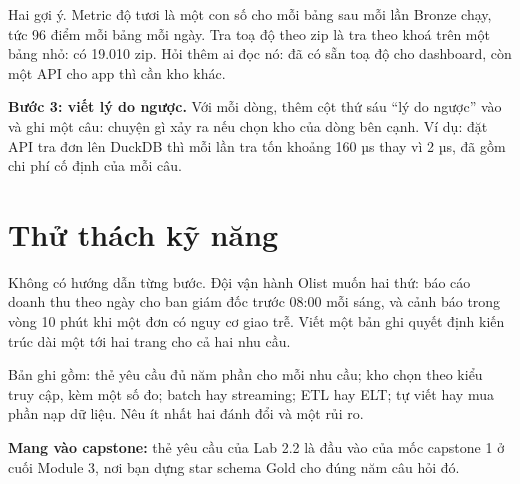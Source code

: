 Hai gợi ý. Metric độ tươi là một con số cho mỗi bảng sau mỗi lần Bronze chạy, tức 96 điểm mỗi bảng mỗi ngày. Tra toạ độ theo zip là tra theo khoá trên một bảng nhỏ:  có 19.010 zip. Hỏi thêm ai đọc nó:  đã có sẵn toạ độ cho dashboard, còn một API cho app thì cần kho khác.

\textbf{Bước 3: viết lý do ngược.} Với mỗi dòng, thêm cột thứ sáu ``lý do ngược'' vào  và ghi một câu: chuyện gì xảy ra nếu chọn kho của dòng bên cạnh. Ví dụ: đặt API tra đơn lên DuckDB thì mỗi lần tra tốn khoảng 160 µs thay vì 2 µs, đã gồm chi phí cố định của mỗi câu.


\section{Thử thách kỹ năng}

\begin{thuthach}
Không có hướng dẫn từng bước. Đội vận hành Olist muốn hai thứ: báo cáo doanh thu theo ngày cho ban giám đốc trước 08:00 mỗi sáng, và cảnh báo trong vòng 10 phút khi một đơn có nguy cơ giao trễ. Viết một bản ghi quyết định kiến trúc dài một tới hai trang cho cả hai nhu cầu.

Bản ghi gồm: thẻ yêu cầu đủ năm phần cho mỗi nhu cầu; kho chọn theo kiểu truy cập, kèm một số đo; batch hay streaming; ETL hay ELT; tự viết hay mua phần nạp dữ liệu. Nêu ít nhất hai đánh đổi và một rủi ro.

\textbf{Mang vào capstone:} thẻ yêu cầu của Lab 2.2 là đầu vào của mốc capstone 1 ở cuối Module 3, nơi bạn dựng star schema Gold cho đúng năm câu hỏi đó.
\end{thuthach}

